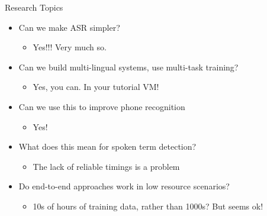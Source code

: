 \begin{frame}{Research Topics}
  \begin{itemize}
  \item Can we make ASR simpler?
    \begin{itemize}
    \item Yes!!! Very much so.
    \end{itemize}
  \item Can we build multi-lingual systems, use multi-task training?
    \begin{itemize}
    \item Yes, you can. In your tutorial VM!
    \end{itemize}
  \item Can we use this to improve phone recognition
    \begin{itemize}
    \item Yes!
    \end{itemize}
  \item What does this mean for spoken term detection?
    \begin{itemize}
    \item The lack of reliable timings is a problem
    \end{itemize}
  \item Do end-to-end approaches work in low resource scenarios?
    \begin{itemize}
    \item 10s of hours of training data, rather than 1000s? But seems ok!
    \end{itemize}
  \end{itemize}
\end{frame}

